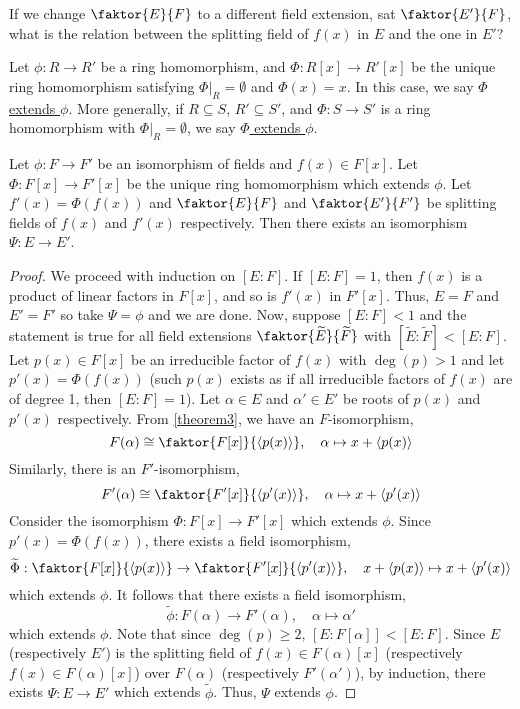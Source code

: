 \documentclass[11pt]{article}
\newcommand{\cyclic}[1]{\left\langle #1 \right\rangle}
\newcommand{\quotient}[2]{\faktor{#1}{#2}}
\begin{document}
If we change $\quotient{E}{F}$ to a different field extension, sat
$\quotient{E'}{F}$, what is the relation between the splitting field of $f(x)$
in $E$ and the one in $E'$?
\begin{definition}
Let $\phi:R\to R'$ be a ring homomorphism, and $\Phi: R[x] \to R'[x]$ be the
unique ring homomorphism satisfying $\Phi \big|_R = \emptyset$ and $\Phi(x) =
x$. In this case, we say \underline{$\Phi$ extends $\phi$}. More generally, if
$R \subseteq S$, $R' \subseteq S'$, and $\Phi: S \to S'$ is a ring homomorphism
with $\Phi \big|_R = \emptyset$, we say \underline{$\Phi$ extends $\phi$}.
\end{definition}
\begin{theorem}
Let $\phi:F \to F'$ be an isomorphism of fields and $f(x) \in F[x]$. Let
$\Phi: F[x] \to F'[x]$ be the unique ring homomorphism which extends $\phi$. Let
$f'(x) = \Phi(f(x))$ and $\quotient{E}{F}$ and $\quotient{E'}{F'}$ be splitting
fields of $f(x)$ and $f'(x)$ respectively. Then there exists an isomorphism
$\Psi:E\to E'$.
\label{theorem13}
\end{theorem}
\begin{proof}
We proceed with induction on $[E:F]$. If $[E:F] = 1$, then $f(x)$ is a product
of linear factors in $F[x]$, and so is $f'(x)$ in $F'[x]$. Thus, $E = F$ and
$E' = F'$ so take $\Psi = \phi$ and we are done. Now, suppose $[E:F] < 1$ and
the statement is true for all field extensions $\quotient{\tilde E}{\tilde F}$
with $[\tilde E: \tilde F]<[E:F]$. Let $p(x) \in F[x]$ be an irreducible factor
of $f(x)$ with $\deg(p)>1$ and let $p'(x) = \Phi(f(x))$ (such $p(x)$ exists as
if all irreducible factors of $f(x)$ are of degree 1, then $[E:F] = 1$). Let
$\alpha \in E$ and $\alpha' \in E'$ be roots of $p(x)$ and $p'(x)$ respectively.
From \cref{theorem3}, we have an $F$-isomorphism,
\begin{equation*}
F(\alpha) \cong \quotient{F[x]}{\cyclic{p(x)}}, \quad \alpha \mapsto x +
\cyclic{p(x)}
\end{equation*}
Similarly, there is an $F'$-isomorphism,
\begin{equation*}
F'(\alpha) \cong \quotient{F'[x]}{\cyclic{p'(x)}}, \quad \alpha \mapsto x +
\cyclic{p'(x)}
\end{equation*}
Consider the isomorphism $\Phi:F[x] \to F'[x]$ which extends $\phi$. Since
$p'(x) = \Phi(f(x))$, there exists a field isomorphism,
\begin{equation*}
\tilde\Phi: \quotient{F[x]}{\cyclic{p(x)}} \to \quotient{F'[x]}{\cyclic{p'(x)}},
\quad x + \cyclic{p(x)} \mapsto  x + \cyclic{p'(x)}
\end{equation*}
which extends $\phi$. It follows that there exists a field isomorphism,
\begin{equation*}
\tilde\phi: F(\alpha) \to F'(\alpha), \quad \alpha \mapsto \alpha'
\end{equation*}
which extends $\phi$. Note that since $\deg(p) \geq 2$, $[E:F[\alpha]] < [E:F]$.
Since $E$ (respectively $E'$) is the splitting field of $f(x) \in
F(\alpha)[x]$ (respectively $f(x) \in F(\alpha)[x]$) over $F(\alpha)$
(respectively $F'(\alpha')$), by induction, there exists $\Psi:E \to E'$ which
extends $\tilde \phi$. Thus, $\Psi$ extends $\phi$.
\end{proof}
\end{document}
